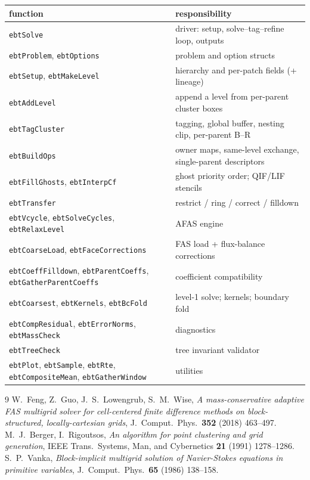 \documentclass[11pt,oneside,openany]{book}
\newcommand{\code}[1]{\textnormal{\texttt{#1}}}
\begin{document}
\begin{center}\small
\begin{tabularx}{\textwidth}{@{}>{\raggedright\arraybackslash}p{}X@{}}
\toprule
function & responsibility \\
\midrule
\code{ebtSolve} & driver: setup, solve--tag--refine loop, outputs \\
\code{ebtProblem}, \code{ebtOptions} & problem and option structs \\
\code{ebtSetup}, \code{ebtMakeLevel} & hierarchy and per-patch fields (+ lineage) \\
\code{ebtAddLevel} & append a level from per-parent cluster boxes \\
\code{ebtTagCluster} & tagging, global buffer, nesting clip, per-parent B--R \\
\code{ebtBuildOps} & owner maps, same-level exchange, single-parent descriptors \\
\code{ebtFillGhosts}, \code{ebtInterpCf} & ghost priority order; QIF/LIF stencils \\
\code{ebtTransfer} & restrict / ring / correct / filldown \\
\code{ebtVcycle}, \code{ebtSolveCycles}, \code{ebtRelaxLevel} & AFAS engine \\
\code{ebtCoarseLoad}, \code{ebtFaceCorrections} & FAS load + flux-balance corrections \\
\code{ebtCoeffFilldown}, \code{ebtParentCoeffs}, \code{ebtGatherParentCoeffs} & coefficient compatibility \\
\code{ebtCoarsest}, \code{ebtKernels}, \code{ebtBcFold} & level-1 solve; kernels; boundary fold \\
\code{ebtCompResidual}, \code{ebtErrorNorms}, \code{ebtMassCheck} & diagnostics \\
\code{ebtTreeCheck} & tree invariant validator \\
\code{ebtPlot}, \code{ebtSample}, \code{ebtRte}, \code{ebtCompositeMean}, \code{ebtGatherWindow} & utilities \\
\bottomrule
\end{tabularx}
\end{center}

\begin{thebibliography}{9}
W.~Feng, Z.~Guo, J.~S.~Lowengrub, S.~M.~Wise,
\emph{A mass-conservative adaptive FAS multigrid solver for
cell-centered finite difference methods on block-structured,
locally-cartesian grids},
J.~Comput.~Phys.\ \textbf{352} (2018) 463--497.
M.~J.~Berger, I.~Rigoutsos,
\emph{An algorithm for point clustering and grid generation},
IEEE Trans.\ Systems, Man, and Cybernetics \textbf{21} (1991)
1278--1286.
S.~P.~Vanka,
\emph{Block-implicit multigrid solution of Navier-Stokes equations in
primitive variables},
J.~Comput.~Phys.\ \textbf{65} (1986) 138--158.
\end{thebibliography}
\end{document}
